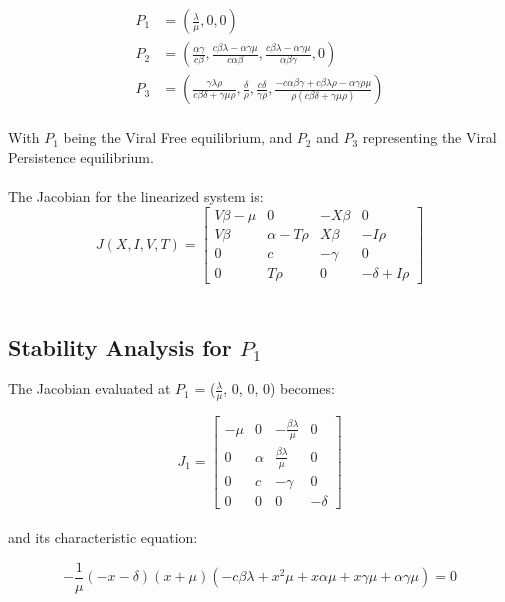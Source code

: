 \documentclass{article}
\begin{document}
\begin{equation}
	\begin{split}
		P_{1} &= (\frac{\lambda}{\mu}, 0, 0)\\	
		P_{2} &= (\frac{\alpha \gamma}{c \beta}, \frac{c  \beta \lambda - \alpha \gamma \mu}{c \alpha \beta}, \frac{c \beta \lambda - \alpha \gamma \mu}{\alpha \beta \gamma}, 0)\\
		P_{3} &= (\frac{\gamma \lambda \rho}{c \beta \delta + \gamma \mu \rho}, \frac{\delta}{\rho}, \frac{c \delta}{\gamma \rho}, \frac{-c \alpha \beta \gamma + c \beta \lambda \rho - \alpha \gamma \rho \mu}{\rho (c \beta \delta + \gamma \mu \rho)})\\
	\end{split}
\end{equation}

With $P_{1}$ being the Viral Free equilibrium, and $P_{2}$ and $P_{3}$ representing the Viral Persistence equilibrium.\\
\\
The Jacobian for the linearized system is:\\

\[J(X, I, V, T) =
	\begin{bmatrix}
		V \beta - \mu & 0 & -X \beta & 0 \\
		V \beta & \alpha - T \rho & X \beta & -I \rho \\
		0 & c & - \gamma & 0 \\
		0 & T \rho & 0 & - \delta + I \rho
	\end{bmatrix}
				\]\\

\subsection{Stability Analysis for $P_{1}$}

The Jacobian evaluated at $P_{1}$ = ($\frac{\lambda}{\mu}$, 0, 0, 0) becomes:

\[J_{1} =
	\begin{bmatrix}
		- \mu & 0 & - \frac{\beta \lambda}{\mu} & 0 \\
		0 & \alpha & \frac{\beta \lambda}{\mu} & 0 \\
		0 & c & - \gamma & 0 \\
		0 & 0 & 0 & - \delta
	\end{bmatrix}
\]\\

and its characteristic equation:

\begin{equation}
	- \frac{1}{\mu}(-x - \delta)(x + \mu)(-c \beta \lambda + x^2 \mu + x \alpha \mu + x \gamma \mu + \alpha \gamma \mu) = 0
\end{equation}
\end{document}
